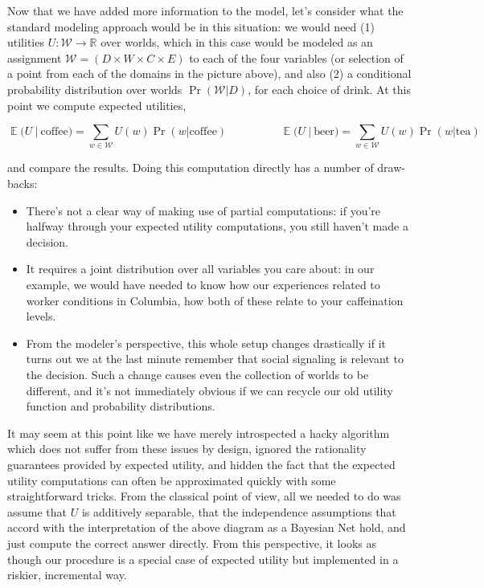 \documentclass{article}
\begin{document}
	
	Now that we have added more information to the model, let's consider what the standard modeling approach would be in this situation: we would need (1) utilities $U : \mathcal W \to \mathbb R$ over worlds, which in this case would be modeled as an assignment $\mathcal W = (D \times W \times C \times E)$ to each of the four variables (or selection of a point from each of the domains in the picture above), and also (2) a conditional probability distribution over worlds $\Pr(\mathcal W | D)$, for each choice of drink. At this point we compute expected utilities,
	
	\[  \mathop{\mathbb E} \Big(U ~\Big|~ \text{coffee}\Big) = \sum\limits_{w \in \mathcal W} U(w) \Pr(w | \mathrm{coffee}) 
	\hspace{2cm} 
	\mathop{\mathbb E} \Big(U ~\Big|~ \text{beer}\Big) = \sum\limits_{w \in \mathcal W} U(w) \Pr(w | \mathrm{tea}) \]
	
	and compare the results. Doing this computation directly has a number of draw-backs:
	\begin{itemize}[nosep]
		\item There's not a clear way of making use of partial computations: if you're halfway through your expected utility computations, you still haven't made a decision.
		\item It requires a joint distribution over all variables you care about: in our example, we would have needed to know how our experiences related to worker conditions in Columbia, how both of these relate to your caffeination levels.
		
		\item From the modeler's perspective, this whole setup changes drastically if it turns out we at the last minute remember that social signaling is relevant to the decision. Such a change causes even the collection of worlds to be different, and it's not immediately obvious if we can recycle our old utility function and probability distributions.
		
	\end{itemize}
	
	It may seem at this point like we have merely introspected a hacky algorithm which does not suffer from these issues by design, ignored the rationality guarantees provided by expected utility, and hidden the fact that the expected utility computations can often be approximated quickly with some straightforward tricks. From the classical point of view, all we needed to do was assume that $U$ is additively separable, that the independence assumptions that accord with the interpretation of the above diagram as a Bayesian Net hold, and just compute the correct answer directly. From this perspective, it looks as though our procedure is a special case of expected utility but implemented in a riskier, incremental way. 
	
\end{document}
